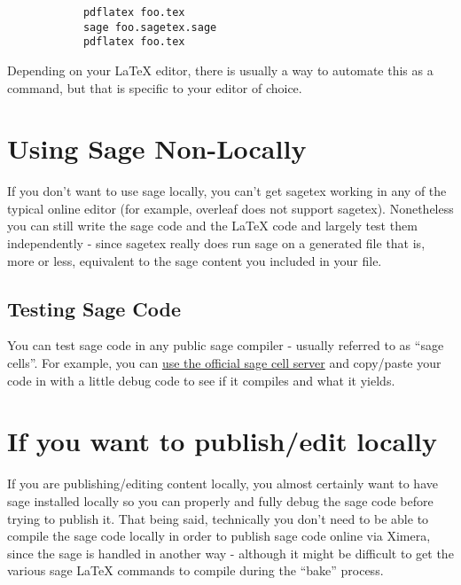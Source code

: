 \documentclass{ximera}
\begin{document}
        \begin{verbatim}
            pdflatex foo.tex
            sage foo.sagetex.sage
            pdflatex foo.tex
        \end{verbatim}
        Depending on your LaTeX editor, there is usually a way to automate this as a command, but that is specific to your editor of choice.
    
\section{Using Sage Non-Locally}
    
    If you don't want to use sage locally, you can't get sagetex working in any of the typical online editor (for example, overleaf does not support sagetex). Nonetheless you can still write the sage code and the LaTeX code and largely test them independently - since sagetex really does run sage on a generated file that is, more or less, equivalent to the sage content you included in your file.
    
    \subsection{Testing Sage Code}
        You can test sage code in any public sage compiler - usually referred to as ``sage cells''. For example, you can \href{https://sagecell.sagemath.org/}{use the official sage cell server} and copy/paste your code in with a little debug code to see if it compiles and what it yields.

\section{If you want to publish/edit locally}
    If you are publishing/editing content locally, you almost certainly want to have sage installed locally so you can properly and fully debug the sage code before trying to publish it. That being said, technically you don't need to be able to compile the sage code locally in order to publish sage code online via Ximera, since the sage is handled in another way - although it might be difficult to get the various sage LaTeX commands to compile during the ``bake'' process.
\end{document}
